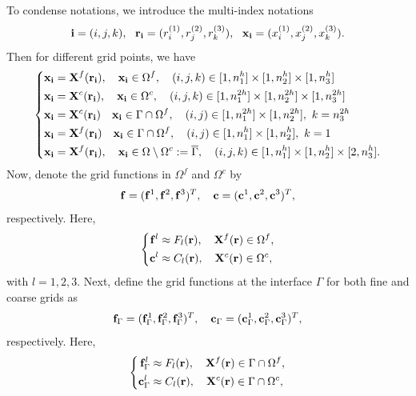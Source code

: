  To condense notations, we introduce the multi-index notations
\[{\bf i} = (i,j,k),\ \ {\bf r}_{\bf i} = (r^{(1)}_i,r^{(2)}_j,r^{(3)}_k),\ \ {\bf x}_{\bf i} = (x^{(1)}_i,x^{(2)}_j,x^{(3)}_k).\]
Then for different grid points, we have
\begin{equation*}
\left\{
\begin{aligned}
{\bf x}_{\bf i} &= {\bf X}^f({\bf r}_{\bf i}), \quad {\bf x}_{\bf i}\in\Omega^f, \quad (i,j,k)\in[1,n_1^h]\times[1,n_2^h]\times[1,n_3^h]\\
{\bf x}_{\bf i} &= {\bf X}^c({\bf r}_{\bf i}), \quad {\bf x}_{\bf i}\in\Omega^c, \quad (i,j,k)\in[1,n_1^{2h}]\times[1,n_2^{2h}]\times[1,n_3^{2h}]\\
{\bf x}_{\bf i} &= {\bf X}^c({\bf r}_{\bf i}) \quad {\bf x}_{\bf i} \in \Gamma\cap\Omega^f, \quad (i,j)\in[1,n_1^{2h}]\times[1,n_2^{2h}],\ k = n_3^{2h}\\
{\bf x}_{\bf i} &= {\bf X}^f({\bf r}_{\bf i}) \quad {\bf x}_{\bf i} \in \Gamma\cap\Omega^f, \quad (i,j)\in[1,n_1^h]\times[1,n_2^h],\ k = 1\\
{\bf x}_{\bf i} &= {\bf X}^f({\bf r}_{\bf i}), \quad {\bf x}_{\bf i}\in \Omega \setminus \Omega^c := \overline{\Gamma}, \quad (i,j,k)\in[1,n_1^h]\times[1,n_2^h]\times[2,n_3^h].
\end{aligned}
\right.
\end{equation*}
Now, denote the grid functions in $\Omega^f$ and $\Omega^c$ by
\begin{equation}\label{grid_function}
{\bf f} = ({\bf f}^1, {\bf f}^2, {\bf f}^3)^T, \quad {\bf c} = ({\bf c}^1, {\bf c}^2, {\bf c}^3)^T,
\end{equation}
respectively. Here, 
\begin{equation*}
\left\{
\begin{aligned}
{\bf f}^l&\approx F_l({\bf r}), \quad {\bf X}^f({\bf r})\in\Omega^f, \\
{\bf c}^l&\approx C_l({\bf r}),\quad {\bf X}^c({\bf r})\in\Omega^c,
\end{aligned}
\right.
\end{equation*}
with $l = 1,2,3$. Next, define the grid functions at the interface $\Gamma$ for both fine and coarse grids as
\[{\bf f}_\Gamma = ({\bf f}_\Gamma^1, {\bf f}_\Gamma^2, {\bf f}_\Gamma^3)^T, \quad {\bf c}_\Gamma = ({\bf c}_\Gamma^1, {\bf c}_\Gamma^2, {\bf c}_\Gamma^3)^T,\]
respectively. Here, 
\begin{equation*}
\left\{
\begin{aligned}
{\bf f}_\Gamma^l&\approx F_l({\bf r}), \quad {\bf X}^f({\bf r})\in\Gamma\cap\Omega^f, \\
{\bf c}_\Gamma^l&\approx C_l({\bf r}),\quad {\bf X}^c({\bf r})\in\Gamma\cap\Omega^c,
\end{aligned}
\right.
\end{equation*}
